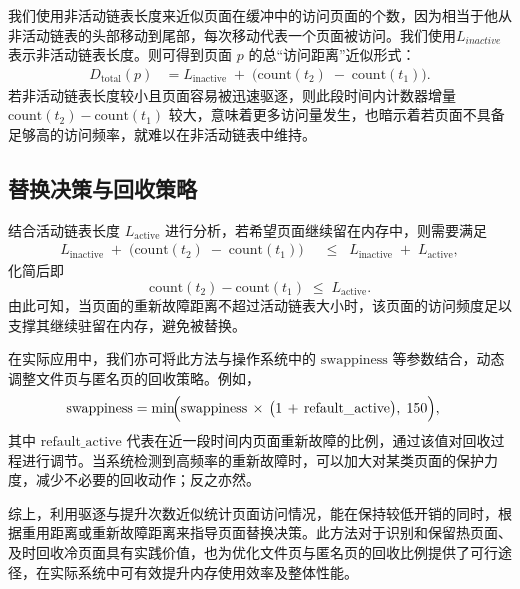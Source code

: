 我们使用非活动链表长度来近似页面在缓冲中的访问页面的个数，因为相当于他从非活动链表的头部移动到尾部，每次移动代表一个页面被访问。我们使用\( L_{inactive}\) 表示非活动链表长度。则可得到页面 \(p\) 的总“访问距离”近似形式：
\begin{align}
  \label{eq:dtotal}
  D_{\mathrm{total}}(p)
  &= 
  L_{\mathrm{inactive}}
  \;+\;
  \bigl(\mathrm{count}(t_2) \;-\; \mathrm{count}(t_1)\bigr).
\end{align}
若非活动链表长度较小且页面容易被迅速驱逐，则此段时间内计数器增量 \(\mathrm{count}(t_2)-\mathrm{count}(t_1)\) 较大，意味着更多访问量发生，也暗示着若页面不具备足够高的访问频率，就难以在非活动链表中维持。


\subsection{替换决策与回收策略}

结合活动链表长度 \(\displaystyle L_{\mathrm{active}}\) 进行分析，若希望页面继续留在内存中，则需要满足
\begin{align}
  \label{eq:active_condition}
  L_{\mathrm{inactive}}
  \;+\;
  \bigl(\mathrm{count}(t_2) \;-\; \mathrm{count}(t_1)\bigr)
  &\;\;\le\;\;
  L_{\mathrm{inactive}}
  \;+\;
  L_{\mathrm{active}},
\end{align}
化简后即
\[
  \mathrm{count}(t_2) - \mathrm{count}(t_1)
  \;\le\;
  L_{\mathrm{active}}.
\]
由此可知，当页面的重新故障距离不超过活动链表大小时，该页面的访问频度足以支撑其继续驻留在内存，避免被替换。

在实际应用中，我们亦可将此方法与操作系统中的 \(\mathrm{swappiness}\) 等参数结合，动态调整文件页与匿名页的回收策略。例如，
\begin{align}
  \mathrm{swappiness}
  &=
  \min\!
  \Bigl(
    \mathrm{swappiness}
    \,\times\,
    \bigl(1 \,+\, \mathrm{refault\_active}\bigr),
    \;150
  \Bigr),
\end{align}
其中 \(\mathrm{refault\_active}\) 代表在近一段时间内页面重新故障的比例，通过该值对回收过程进行调节。当系统检测到高频率的重新故障时，可以加大对某类页面的保护力度，减少不必要的回收动作；反之亦然。

综上，利用驱逐与提升次数近似统计页面访问情况，能在保持较低开销的同时，根据重用距离或重新故障距离来指导页面替换决策。此方法对于识别和保留热页面、及时回收冷页面具有实践价值，也为优化文件页与匿名页的回收比例提供了可行途径，在实际系统中可有效提升内存使用效率及整体性能。




